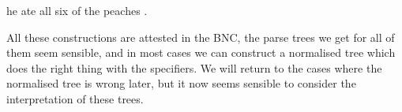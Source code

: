 \documentclass[11pt,a4paper]{article}
\begin{document}
\begin{examples}
\item \label{ALLSIXOFTHE} he ate all six of the peaches .
\end{examples}

\begin{figure}[ht]
\hspace*{\fill}
\begin{minipage}[t]{0.45\linewidth}

\end{minipage}
\hspace*{\fill}
\caption{}\label{he ate all six of the peaches .}
\end{figure}

All these constructions are attested in the BNC, the parse trees we
get for all of them seem sensible, and in most cases we can construct
a normalised tree which does the right thing with the specifiers. We
will return to the cases where the normalised tree is wrong later, but
it now seems sensible to consider the interpretation of these trees.
\end{document}
